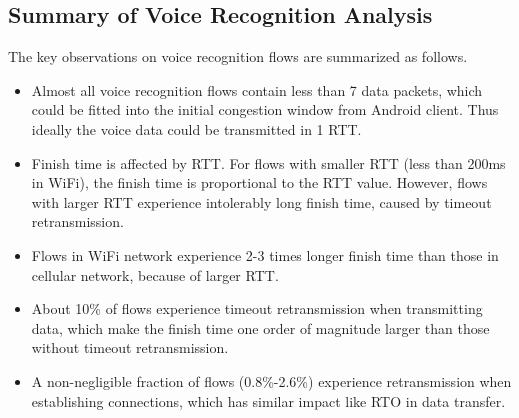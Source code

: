 \subsection{Summary of Voice Recognition Analysis}

The key observations on voice recognition flows are summarized as follows.
\begin{itemize}
	\item Almost all voice recognition flows contain less than 7 data packets, which could be fitted into the initial congestion window from Android client. Thus ideally the voice data could be transmitted in 1 RTT.
	\item Finish time is affected by RTT. For flows with smaller RTT (less than 200ms in WiFi), the finish time is proportional to the RTT value. However, flows with larger RTT experience intolerably long finish time, caused by timeout retransmission.
	\item Flows in WiFi network experience 2-3 times longer finish time than those in cellular network, because of larger RTT.
	\item About 10\% of flows experience timeout retransmission when transmitting data, which make the finish time one order of magnitude larger than those without timeout retransmission.
	\item A non-negligible fraction of flows (0.8\%-2.6\%) experience retransmission when establishing connections, which has similar impact like RTO in data transfer.
\end{itemize}
